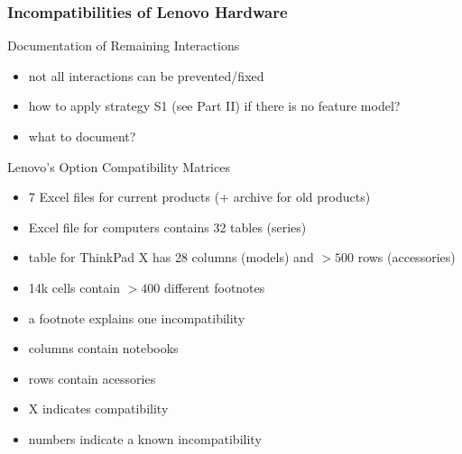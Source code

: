 \subsubsection*{Incompatibilities of Lenovo Hardware}
\begin{frame}{\myframetitle}
	\begin{mycolumns}[widths={55}]
		\begin{note}{Documentation of Remaining Interactions}
			\begin{itemize}
				\item not all interactions can be prevented/fixed
				\item how to apply strategy S1 (see Part II) if there is no feature model?
				\item what to document?
			\end{itemize}
		\end{note}
		\begin{example}{Lenovo's Option Compatibility Matrices}
			\begin{itemize}
				\item 7 Excel files for current products (+ archive for old products)
				\item Excel file for computers contains 32 tables (series)
				\item table for ThinkPad X has 28 columns (models) and $>500$ rows (accessories)
				\item 14k cells contain $>400$ different footnotes
				\item a footnote explains one incompatibility
			\end{itemize}
		\end{example}
	\mynextcolumn
	\end{mycolumns}
\end{frame}
\begin{frame}{\myframetitle}
	\begin{mycolumns}[widths={80},animation=none]
	\mynextcolumn
		\begin{example}{}\setlength\leftmargini{3mm} 
			\begin{itemize}
				\item columns contain notebooks
				\item rows contain acessories
				\item X indicates compatibility
				\item numbers indicate a known incompatibility
			\end{itemize}
		\end{example}
	\end{mycolumns}
\end{frame}
